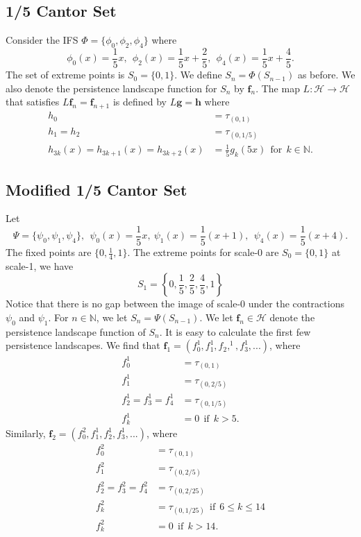 \documentclass [52pt] {article}
\newcommand{\N}{\mathbb{N}}
\newcommand{\Hil}{\mathcal{H}}
\begin{document}
\subsection{1/5 Cantor Set}
Consider the IFS $\Phi = \{\phi_0,\phi_2,\phi_4\}$ where
\[\phi_0(x) = \frac{1}{5}x,\:\:\phi_2(x) = \frac{1}{5}x+\frac{2}{5},\:\:\phi_4(x) = \frac{1}{5}x+\frac{4}{5}.\]
The set of extreme points is $S_0 = \{0,1\}$.  We define $S_n = \Phi(S_{n-1})$ as before.  We also denote the persistence landscape function for $S_n$ by $\mathbf{f}_n$.  The map $L:\Hil\to\Hil$ that satisfies $L\mathbf{f}_n = \mathbf{f}_{n+1}$ is defined by $L\mathbf{g} = \mathbf{h}$ where
\[\begin{split}
h_0 &= \tau_{(0,1)}\\
h_1 = h_2 &= \tau_{(0,1/5)}\\
h_{3k}(x) = h_{3k+1}(x) = h_{3k+2}(x) &= \frac{1}{5}g_k(5x)\:\:\text{for}\:\:k\in\mathbb{N}.
\end{split}\]

\subsection{Modified 1/5 Cantor Set}

Let 
\[\Psi = \{\psi_0,\psi_1,\psi_4\},\:\:\psi_0(x) = \frac{1}{5}x,\:\psi_1(x) = \frac{1}{5}(x+1),\:\:\psi_4(x) = \frac{1}{5}(x+4).\]
The fixed points are $\{0,\frac{1}{4},1\}$.  The extreme points for scale-0 are $S_0=\{0,1\}$ at scale-1, we have
\[S_1=\left\{0,\frac{1}{5}, \frac{2}{5},\frac{4}{5},1\right\}\]
Notice that there is no gap between the image of scale-0 under the contractions $\psi_0$ and $\psi_1$.  For $n\in\N$, we let $S_n =\Psi( S_{n-1})$.  We let $\mathbf{f}_n\in\Hil$ denote the persistence landscape function of $S_n$.  It is easy to calculate the first few persistence landscapes.  We find that $\mathbf{f}_1 = (f_0^1, f_1^1,f_2,^1,f_3^1,...)$, where
\[\begin{split}
f_0^1 &= \tau_{(0,1)}\\
f_1^1 &= \tau_{(0,2/5)}\\
f_2^1=f_3^1=f_4^1 &= \tau_{(0,1/5)}\\
f_k^1 &=0\:\:\text{if}\:\: k>5.
\end{split}\]
Similarly, $\mathbf{f}_2 = (f_0^2,f_1^1,f_2^1,f_3^1,...)$, where
\[\begin{split}
f_0^2 &= \tau_{(0,1)}\\
f_1^2 &= \tau_{(0,2/5)}\\
f_2^2=f_3^2=f_4^2 &= \tau_{(0,2/25)}\\
f_k^2 &=\tau_{(0,1/25)}\:\:\text{if}\:\: 6\le k\le 14\\
f_k^2 & = 0\:\:\text{if}\:\:k>14.
\end{split}\]
\end{document}
